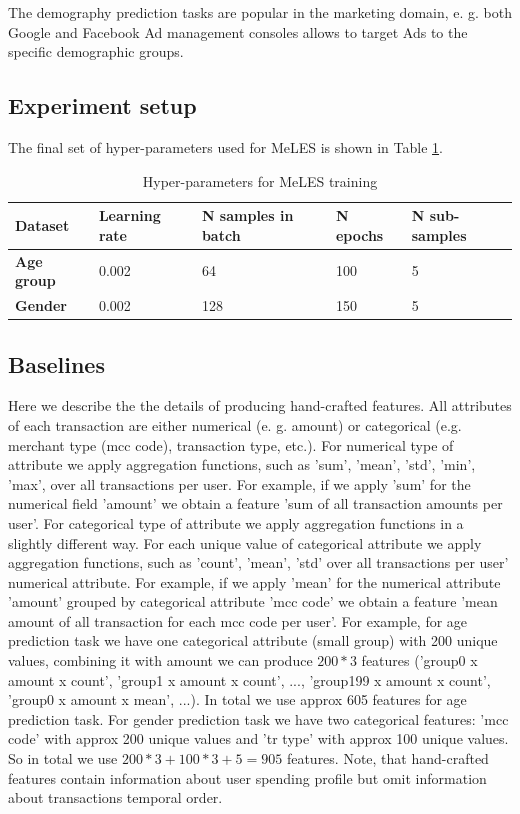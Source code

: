 \documentclass{article}
\begin{document}
The demography prediction tasks are popular in the marketing domain, e. g. both Google and Facebook Ad management consoles allows to target Ads to the specific demographic groups.

\subsection{Experiment setup}

The final set of hyper-parameters used for MeLES is shown in Table \ref{tab-hyper}.

\begin{table}
\centering
\caption{Hyper-parameters for MeLES training}
\begin{tabular}{lllll}
\toprule
\textbf{Dataset} & \textbf{Learning rate} & \textbf{N samples in batch} & \textbf{N epochs} & \textbf{N sub-samples} \\
\midrule
\textbf{Age group} & 0.002 & 64 & 100 & 5 \\
\textbf{Gender} & 0.002 & 128 & 150 & 5 \\
\bottomrule
\end{tabular}
\label{tab-hyper}
\end{table}

\subsection{Baselines} \label{sec-baselines}

Here we describe the the details of producing hand-crafted features. All attributes of each transaction are either numerical (e. g. amount) or categorical (e.g. merchant type (mcc code), transaction type, etc.). 
For numerical type of attribute we apply aggregation functions, such as 'sum', 'mean', 'std', 'min', 'max', over all transactions per user. For example, if we apply 'sum' for the numerical field 'amount' we obtain a feature 'sum of all transaction amounts per user'. 
For categorical type of attribute we apply aggregation functions in a slightly different way. For each unique value of categorical attribute we apply aggregation functions, such as 'count', 'mean', 'std' over all transactions per user' numerical attribute. For example, if we apply 'mean' for the numerical attribute 'amount' grouped by categorical attribute 'mcc code' we obtain a feature 'mean amount of all transaction for each mcc code per user'. 
For example, for age prediction task we have one categorical attribute (small group) with 200 unique values, combining it with amount we can produce $200 * 3$ features ('group0 x amount x count',  'group1 x amount x count', ..., 'group199 x amount x count', 'group0 x amount x mean', ...). In total we use approx 605 features for age prediction task. For gender prediction task we have two categorical features: 'mcc code' with approx 200 unique values and 'tr type' with approx 100 unique values. So in total we use $200 * 3 + 100 * 3 + 5 = 905$ features.
Note, that hand-crafted features contain information about user spending profile but omit information about transactions temporal order.
\end{document}
